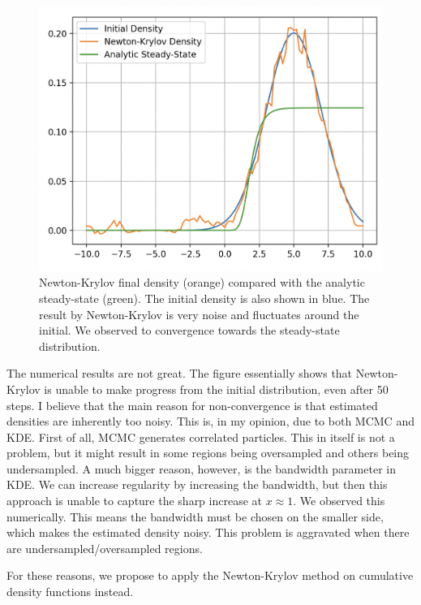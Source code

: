 \documentclass{article}
\begin{document}
\begin{figure}[ht]
    \centering
    \includegraphics[width=0.7\linewidth]{figures/Simple Chemotaxis Density.png}
    \caption{Newton-Krylov final density (orange) compared with the analytic steady-state (green). The initial density is also shown in blue. The result by Newton-Krylov is very noise and fluctuates around the initial. We observed to convergence towards the steady-state distribution.}
    \label{fig:density_convergence}
\end{figure}

The numerical results are not great. The figure essentially shows that Newton-Krylov is unable to make progress from the initial distribution, even after 50 steps. I believe that the main reason for non-convergence is that estimated densities are inherently too noisy. This is, in my opinion, due to both MCMC and KDE. First of all, MCMC generates correlated particles. This in itself is not a problem, but it might result in some regions being oversampled and others being undersampled. A much bigger reason, however, is the bandwidth parameter in KDE. We can increase regularity by increasing the bandwidth, but then this approach is unable to capture the sharp increase at $x \approx 1$. We observed this numerically. This means the bandwidth must be chosen on the smaller side, which makes the estimated density noisy. This problem is aggravated when there are undersampled/oversampled regions.

For these reasons, we propose to apply the Newton-Krylov method on cumulative density functions instead.
\end{document}
